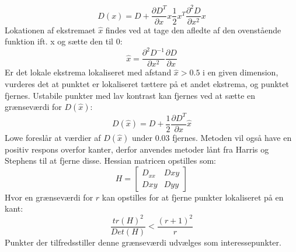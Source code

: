 \begin{equation}
D(x)=D+\dfrac{\partial D^T}{\partial x}x\dfrac{1}{2}x^T\dfrac{\partial^2D}{\partial x^2}x
\end{equation}
Lokationen af ekstremaet $\hat{x}$ findes ved at tage den afledte af den ovenstående funktion ift. x og sætte den til 0:
\begin{equation}
\hat{x}= \dfrac{\partial^2 D^{-1}}{\partial x^2}\dfrac{\partial D}{\partial x}
\end{equation}
Er det lokale ekstrema lokaliseret med afstand $\hat{x}>0.5$ i en given dimension, vurderes det at punktet er lokaliseret tættere på et andet ekstrema, og punktet fjernes. Ustabile punkter med lav kontrast kan fjernes ved at sætte en grænseværdi for $ D(\hat{x}) $:
\begin{equation}
D(\hat{x})=D+\dfrac{1}{2}\dfrac{\partial D^T}{\partial x}\hat{x}
\end{equation}
Lowe foreslår at værdier af $D(\hat{x})$ under 0.03 fjernes. Metoden vil også have en positiv respons overfor kanter, derfor anvendes metoder lånt fra Harris og Stephens \cite{harris} til at fjerne disse. Hessian matricen opstilles som:
\begin{equation}
H =
\begin{bmatrix}
D_{xx} & D{xy} \\
D{xy} & D{yy}
\end{bmatrix}
\end{equation}
Hvor en grænseværdi for $r$ kan opstilles for at fjerne punkter lokaliseret på en kant:
\begin{equation}
\dfrac{tr(H)^2}{Det(H)}<\dfrac{(r+1)^2}{r}
\end{equation}
Punkter der tilfredsstiller denne grænseværdi udvælges som interessepunkter. 


